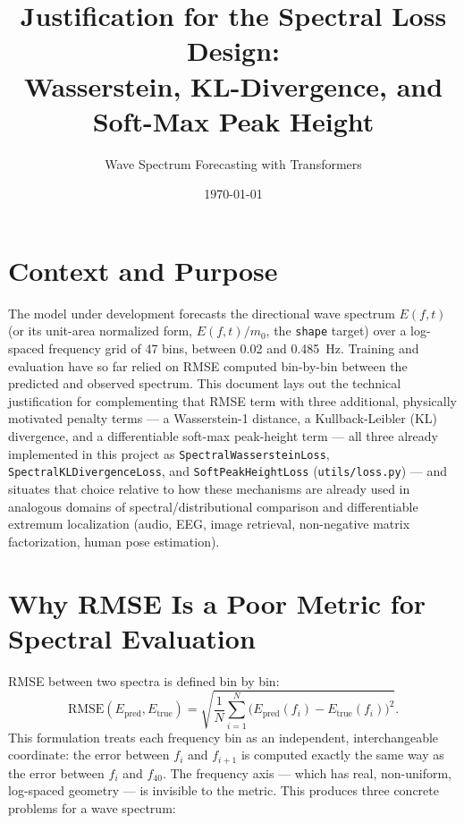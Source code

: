 \documentclass[11pt,a4paper]{article}
\title{\vspace{-1.5em}Justification for the Spectral Loss Design:\\
Wasserstein, KL-Divergence, and Soft-Max Peak Height}
\author{Wave Spectrum Forecasting with Transformers}
\date{\today}
\begin{document}
\maketitle
\vspace{-2em}

\section{Context and Purpose}

The model under development forecasts the directional wave spectrum
$E(f,t)$ (or its unit-area normalized form, $E(f,t)/m_0$, the \texttt{shape}
target) over a log-spaced frequency grid of 47 bins, between 0.02 and
0.485~Hz. Training and evaluation have so far relied on RMSE computed
bin-by-bin between the predicted and observed spectrum. This document lays
out the technical justification for complementing that RMSE term with three
additional, physically motivated penalty terms — a Wasserstein-1 distance, a
Kullback-Leibler (KL) divergence, and a differentiable soft-max peak-height
term — all three already implemented in this project as
\texttt{SpectralWassersteinLoss}, \texttt{SpectralKLDivergenceLoss}, and
\texttt{SoftPeakHeightLoss} (\texttt{utils/loss.py}) — and situates that
choice relative to how these mechanisms are already used in analogous
domains of spectral/distributional comparison and differentiable extremum
localization (audio, EEG, image retrieval, non-negative matrix
factorization, human pose estimation).

\section{Why RMSE Is a Poor Metric for Spectral Evaluation}
\label{sec:rmse-problem}

RMSE between two spectra is defined bin by bin:
\begin{equation}
\text{RMSE}(E_{\text{pred}}, E_{\text{true}}) =
\sqrt{\frac{1}{N}\sum_{i=1}^{N}\big(E_{\text{pred}}(f_i) - E_{\text{true}}(f_i)\big)^2}.
\end{equation}
This formulation treats each frequency bin as an independent, interchangeable
coordinate: the error between $f_i$ and $f_{i+1}$ is computed exactly the
same way as the error between $f_i$ and $f_{40}$. The frequency axis — which
has real, non-uniform, log-spaced geometry — is invisible to the metric.
This produces three concrete problems for a wave spectrum:
\end{document}
